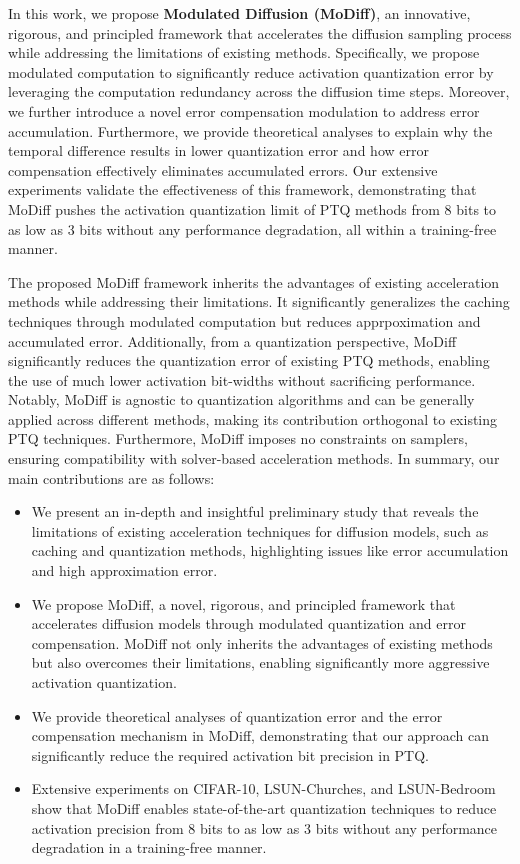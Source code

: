 In this work, we propose \textbf{Modulated Diffusion (MoDiff)}, an innovative, rigorous, and principled framework that accelerates the diffusion sampling process while addressing the limitations of existing methods. 
Specifically, we propose modulated computation to significantly reduce activation quantization error by leveraging the computation redundancy across the diffusion time steps. Moreover, we further introduce a novel error compensation modulation to address error accumulation. Furthermore, we provide theoretical analyses to explain why the temporal difference results in lower quantization error and how error compensation effectively eliminates accumulated errors.
Our extensive experiments validate the effectiveness of this framework, demonstrating that MoDiff pushes the activation quantization limit of PTQ methods from 8 bits to as low as 3 bits without any performance degradation, all within a training-free manner.

The proposed MoDiff framework inherits the advantages of existing acceleration methods while addressing their limitations. It significantly generalizes the caching techniques through modulated computation but reduces apprpoximation and accumulated error. Additionally, from a quantization perspective, MoDiff significantly reduces the quantization error of existing PTQ methods, enabling the use of much lower activation bit-widths without sacrificing performance. Notably, MoDiff is agnostic to quantization algorithms and can be generally applied across different methods, making its contribution orthogonal to existing PTQ techniques. Furthermore, MoDiff imposes no constraints on samplers, ensuring compatibility with solver-based acceleration methods.
In summary, our main contributions are as follows:

\begin{itemize}
\item We present an in-depth and insightful preliminary study that reveals the limitations of existing acceleration techniques for diffusion models, such as caching and quantization methods, highlighting issues like error accumulation and high approximation error. 
\item We propose MoDiff, a novel, rigorous, and principled framework that accelerates diffusion models through modulated quantization and error compensation. MoDiff not only inherits the advantages of existing methods but also overcomes their limitations, enabling significantly more aggressive activation quantization.
\item We provide theoretical analyses of quantization error and the error compensation mechanism in MoDiff, demonstrating that our approach can significantly reduce the required activation bit precision in PTQ.
\item Extensive experiments on CIFAR-10, LSUN-Churches, and LSUN-Bedroom show that MoDiff enables state-of-the-art quantization techniques to reduce activation precision from 8 bits to as low as 3 bits without any performance degradation in a training-free manner.
\end{itemize}


